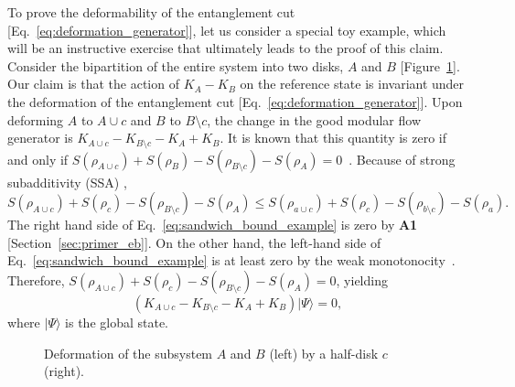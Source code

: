 \documentclass[12pt, nofootinbib]{article}
\theoremstyle{plain}
\theoremstyle{assumption}
\theoremstyle{definition}
\theoremstyle{plain}
\theoremstyle{plain}
\theoremstyle{plain}
\theoremstyle{plain}
\theoremstyle{plain}
\begin{document}
To prove the deformability of the entanglement cut [Eq.~\eqref{eq:deformation_generator}], let us consider a special toy example, which will be an instructive exercise that ultimately leads to the proof of this claim. Consider the bipartition of the entire system into two disks, $A$ and $B$ [Figure~\ref{fig:deformation_example}]. Our claim is that the action of $K_A - K_B$ on the reference state is invariant under the deformation of the entanglement cut [Eq.~\eqref{eq:deformation_generator}]. Upon deforming $A$ to $A\cup c$ and $B$ to $B\setminus c$, the change in the good modular flow generator is $K_{A\cup c} - K_{B\setminus c} - K_A + K_B$. It is known that this quantity is zero if and only if $S(\rho_{A\cup c}) + S(\rho_B) - S(\rho_{B\setminus c}) - S(\rho_A)=0$~\cite{Lin2022-op}. Because of strong subadditivity (SSA) \cite{Lieb1973},
\begin{equation}
    S(\rho_{A\cup c}) + S(\rho_c) - S(\rho_{B\setminus c}) - S(\rho_A) \leq  S(\rho_{a\cup c}) + S(\rho_c) - S(\rho_{b\setminus c}) - S(\rho_a).\label{eq:sandwich_bound_example}
\end{equation}
The right hand side of Eq.~\eqref{eq:sandwich_bound_example} is zero by \textbf{A1} [Section~\ref{sec:primer_eb}]. 
On the other hand, the left-hand side of Eq.~\eqref{eq:sandwich_bound_example} is at least zero by the weak monotonocity~\cite{Lieb1973}. Therefore, $S(\rho_{A\cup c}) + S(\rho_c) - S(\rho_{B\setminus c}) - S(\rho_A)=0$, yielding 
\begin{equation}
    (K_{A\cup c} - K_{B\setminus c} - K_A + K_B)|\Psi\rangle=0, \label{eq:operator_identity_wm}
\end{equation}
where $|\Psi\rangle$ is the global state.

\begin{figure}[h]
    \centering
    \caption{Deformation of the subsystem $A$ and $B$ 
(left) by a half-disk $c$ (right).}
    \label{fig:deformation_example}
\end{figure}
\end{document}
